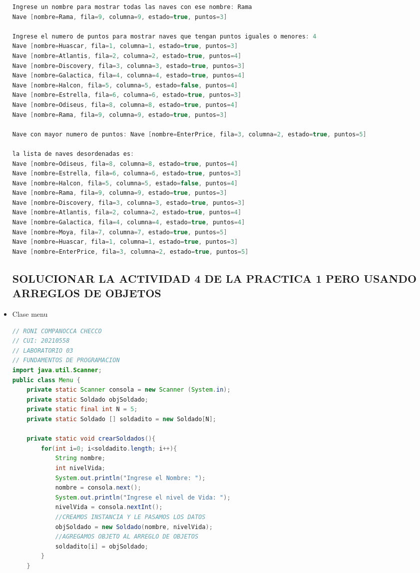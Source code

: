 \documentclass{article}
\begin{document}
\begin{itemize}
\begin{lstlisting}[language=java]
Ingrese un nombre para mostrar todas las naves con ese nombre: Rama
Nave [nombre=Rama, fila=9, columna=9, estado=true, puntos=3]

Ingrese el numero de puntos para mostrar naves que tengan puntos iguales o menores: 4
Nave [nombre=Huascar, fila=1, columna=1, estado=true, puntos=3]
Nave [nombre=Atlantis, fila=2, columna=2, estado=true, puntos=4]
Nave [nombre=Discovery, fila=3, columna=3, estado=true, puntos=3]
Nave [nombre=Galactica, fila=4, columna=4, estado=true, puntos=4]
Nave [nombre=Halcon, fila=5, columna=5, estado=false, puntos=4]
Nave [nombre=Estrella, fila=6, columna=6, estado=true, puntos=3]
Nave [nombre=Odiseus, fila=8, columna=8, estado=true, puntos=4]
Nave [nombre=Rama, fila=9, columna=9, estado=true, puntos=3]

Nave con mayor numero de puntos: Nave [nombre=EnterPrice, fila=3, columna=2, estado=true, puntos=5]

la lista de naves desordenadas es:
Nave [nombre=Odiseus, fila=8, columna=8, estado=true, puntos=4]
Nave [nombre=Estrella, fila=6, columna=6, estado=true, puntos=3]
Nave [nombre=Halcon, fila=5, columna=5, estado=false, puntos=4]
Nave [nombre=Rama, fila=9, columna=9, estado=true, puntos=3]
Nave [nombre=Discovery, fila=3, columna=3, estado=true, puntos=3]
Nave [nombre=Atlantis, fila=2, columna=2, estado=true, puntos=4]
Nave [nombre=Galactica, fila=4, columna=4, estado=true, puntos=4]
Nave [nombre=Moya, fila=7, columna=7, estado=true, puntos=5]
Nave [nombre=Huascar, fila=1, columna=1, estado=true, puntos=3]
Nave [nombre=EnterPrice, fila=3, columna=2, estado=true, puntos=5]
         \end{lstlisting}
    
    \subsection{SOLUCIONAR LA ACTIVIDAD 4 DE LA PRACTICA 1 PERO USANDO ARREGLOS DE OBJETOS}
    
    \item Clase menu
    \begin{lstlisting}[language=java]
// RONI COMPANOCCA CHECCO
// CUI: 20210558
// LABORATORIO 03
// FUNDAMENTOS DE PROGRAMACION 
import java.util.Scanner;
public class Menu {
    private static Scanner consola = new Scanner (System.in);
    private static Soldado objSoldado;
    private static final int N = 5;
    private static Soldado [] soldadito = new Soldado[N];

    private static void crearSoldados(){
        for(int i=0; i<soldadito.length; i++){
            String nombre;
            int nivelVida;
            System.out.println("Ingrese el Nombre: ");
            nombre = consola.next();
            System.out.println("Ingrese el nivel de Vida: ");
            nivelVida = consola.nextInt();
            //CREAMOS INSTANCIA Y LE PASAMOS LOS DATOS
            objSoldado = new Soldado(nombre, nivelVida);
            //AGREGAMOS OBJETO AL ARREGLO DE OBJETOS
            soldadito[i] = objSoldado;
        }
    }


\end{lstlisting}
\end{itemize}
\end{document}
